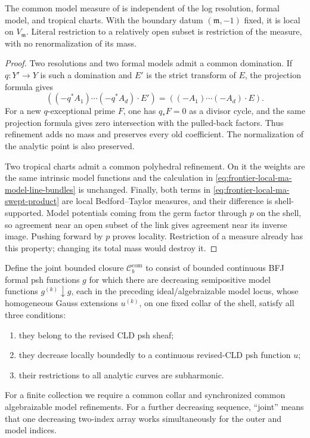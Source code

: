 \begin{proposition}\label{prop:frontier-local-ma-independence}
The common model measure of
 is independent of the log
resolution, formal model, and tropical charts.  With the boundary datum
\((\mathfrak m,-1)\) fixed, it is local on \(V_{\mathfrak m}\).  Literal
restriction to a relatively open subset is restriction of the measure, with
no renormalization of its mass.
\end{proposition}

\begin{proof}
Two resolutions and two formal models admit a common domination.  If
\(q:Y'\to Y\) is such a domination and \(E'\) is the strict transform of
\(E\), the projection formula gives
\[
 ((-q^*A_1)\cdots(-q^*A_d)\cdot E')
   =((-A_1)\cdots(-A_d)\cdot E).
\]
For a new \(q\)-exceptional prime \(F\), one has \(q_*F=0\) as a divisor
cycle, and the same projection formula gives zero intersection with the
pulled-back factors.  Thus refinement adds no mass and preserves every old
coefficient.  The normalization of the analytic point is also preserved.

Two tropical charts admit a common polyhedral refinement.  On it the
weights are the same intrinsic model functions and the calculation in
\eqref{eq:frontier-local-ma-model-line-bundles} is unchanged.  Finally, both
terms in \eqref{eq:frontier-local-ma-swept-product} are local
Bedford--Taylor measures, and their difference is shell-supported.  Model
potentials coming from the germ factor through \(p\) on the shell, so
agreement near an open subset of the link gives agreement near its inverse
image.  Pushing forward by \(p\) proves locality.  Restriction of a measure
already has this property; changing its total mass would destroy it.
\end{proof}

Define the joint bounded closure \(\mathcal C_b^{\mathrm{com}}\) to consist
of bounded continuous BFJ formal psh functions \(g\) for which there are
decreasing semipositive model functions \(g^{(k)}\downarrow g\), each in
the preceding ideal/algebraizable model locus, whose homogeneous Gauss
extensions \(u^{(k)}\), on one fixed collar of the shell, satisfy all three
conditions:
\begin{enumerate}
\item they belong to the revised CLD psh sheaf;
\item they decrease locally boundedly to a continuous revised-CLD psh
      function \(u\);
\item their restrictions to all analytic curves are subharmonic.
\end{enumerate}
For a finite collection we require a common collar and synchronized common
algebraizable model refinements.  For a further decreasing sequence,
``joint'' means that one decreasing two-index array works simultaneously for
the outer and model indices.


